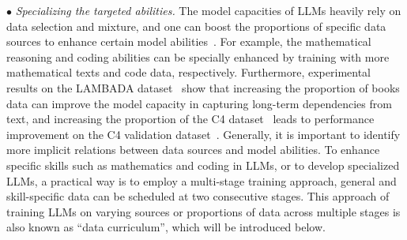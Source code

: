 {$\bullet$ \emph{Specializing the targeted abilities.} 
The model capacities of LLMs heavily rely on data selection and mixture, and one can boost the proportions of specific data sources to enhance certain model abilities~\cite{Rae-arxiv-2021-Scaling,Longpre-arxiv-2023-pretrainer}.  
For example,   
 the mathematical reasoning and coding abilities can be specially enhanced by training with more mathematical texts and code data, respectively. 
Furthermore, experimental results on the LAMBADA dataset~\cite{Paperno-ACL-2016-LAMBADA} show that increasing the proportion of books data can improve the model capacity  in capturing long-term dependencies from text, and increasing the proportion of the C4 dataset~\cite{Raffel-JMLR-2020-Exploring} leads to performance improvement on the C4 validation dataset~\cite{Rae-arxiv-2021-Scaling}.  
Generally, it is important to identify more implicit relations between data sources and  model abilities. {
To enhance specific skills such as mathematics and coding in LLMs, or to develop specialized LLMs, a practical way is to employ a multi-stage training approach, \eg general and skill-specific data can be  scheduled at two consecutive stages. This approach of training LLMs on varying sources or proportions of data across multiple stages is also known as ``data curriculum'', which will be introduced below.   
}

}
